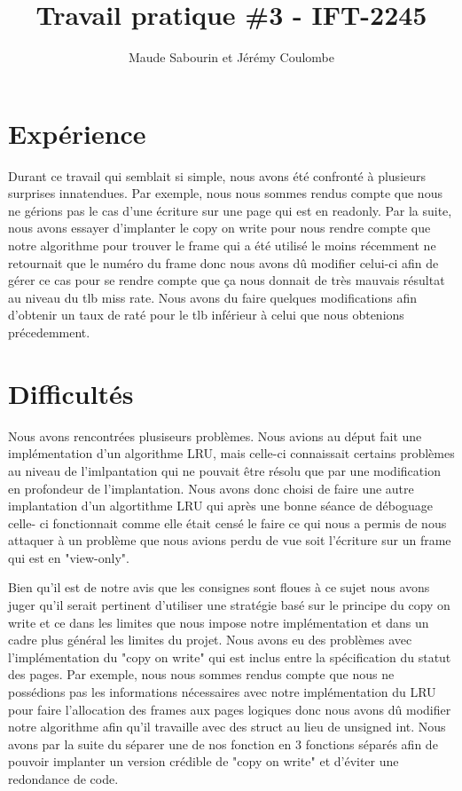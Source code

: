 \documentclass{article}
\title{Travail pratique \#3 - IFT-2245}
\author{Maude Sabourin et Jérémy Coulombe}
\begin{document}
\maketitle

\section{Expérience}
Durant ce travail qui semblait si simple, nous avons été confronté à plusieurs surprises innatendues. Par exemple, nous nous sommes rendus compte que nous ne gérions pas le cas d'une écriture sur une page qui est en readonly. Par la suite, nous avons essayer d'implanter le copy on write pour nous rendre compte que notre algorithme pour trouver le frame qui a été utilisé le moins récemment ne retournait que le numéro du frame donc nous avons dû modifier celui-ci afin de gérer ce cas pour se rendre compte que ça nous donnait de très mauvais résultat au niveau du tlb miss rate. Nous avons du faire quelques modifications afin d'obtenir un taux de raté pour le tlb inférieur à celui que nous obtenions précedemment.

\section {Difficultés}
Nous avons rencontrées plusiseurs  problèmes. Nous avions au déput fait une implémentation d'un algorithme LRU, mais celle-ci connaissait certains problèmes au niveau de l'imlpantation qui ne pouvait être résolu que par une modification en profondeur de l'implantation. Nous avons donc choisi de faire une autre implantation d'un algortithme LRU qui après une bonne séance de déboguage celle- ci fonctionnait comme elle était censé  le faire ce qui nous a permis de nous attaquer à un problème que nous avions perdu de vue soit l'écriture sur un frame qui est en "view-only".
\par
 Bien qu'il est de notre avis que les consignes sont floues à ce sujet nous avons juger qu'il serait pertinent d'utiliser une stratégie basé sur le principe du copy on write et ce dans les limites que nous impose notre implémentation et dans un cadre plus général les limites du projet.  Nous avons eu des problèmes avec l'implémentation du "copy on write" qui est inclus entre la spécification du statut des pages. Par exemple, nous nous sommes rendus compte que nous ne possédions pas les informations nécessaires avec notre implémentation du LRU pour faire l'allocation des frames aux pages logiques donc nous avons dû modifier notre algorithme afin qu'il travaille avec des struct au lieu de unsigned int.  Nous avons par la suite du séparer une de nos fonction en 3 fonctions séparés afin de pouvoir implanter un version crédible de "copy on write" et d'éviter une redondance de code.  
\par
\end{document}
